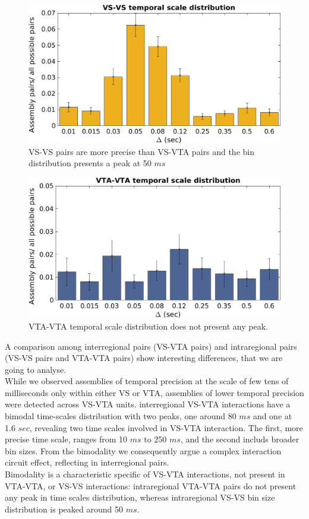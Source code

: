 \begin{figure}[h!]
\includegraphics[scale=0.46]{figures/VS_VS_S.png}
\caption{VS-VS pairs are more precise than VS-VTA pairs and the bin distribution presents a peak at 50 $ms$}
\label{fig:BinDistrVS}
\end{figure}
\begin{figure}[h!]
\includegraphics[scale=0.46]{figures/VTA_VTA_S.png}
\caption{VTA-VTA temporal scale distribution does not present any peak.}
\label{fig:BinDistrVTA}
\end{figure}
A comparison among interregional pairs (VS-VTA pairs) and intraregional pairs (VS-VS pairs and VTA-VTA pairs) show interesting differences, that we are going to analyse.\\
While we observed assemblies of temporal precision at the scale of few tens of milliseconds only within either VS or VTA, assemblies of lower temporal precision were detected across VS-VTA units. interregional VS-VTA interactions have a bimodal time-scales distribution with two peaks, one around 80 $ms$ and one at 1.6 $sec$, revealing two time scales involved in VS-VTA interaction. The first, more precise time scale, ranges from 10 $ms$ to 250 $ms$, and the second includs broader bin sizes. From the bimodality we consequently argue a complex interaction circuit effect, reflecting in interregional pairs.\\Bimodality is a characteristic specific of VS-VTA interactions, not present in VTA-VTA, or VS-VS interactions: intraregional VTA-VTA pairs do not present any peak in time scales distribution, whereas intraregional VS-VS bin size distribution is peaked around 50 $ms$.  

